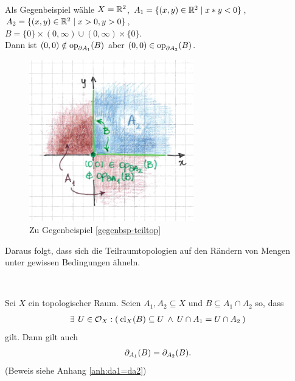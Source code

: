     \begin{gegenbsp}\label{gegenbsp-teiltop}\ \\
        Als Gegenbeispiel wähle $X = \mathbb{R}^2$, ${A_1 = \{(x,y) \in \mathbb{R}^2 \mid x*y < 0\}}$, ${A_2 = \{(x,y) \in \mathbb{R}^2 \mid x > 0, y > 0\}}$, \\
        ${B = \{0\} \times (0, \infty) \cup (0,\infty) \times \{0\}}$.\\
        Dann ist ${(0,0) \notin \text{op}_{\partial A_1}(B)}$ aber ${(0,0) \in \text{op}_{\partial A_2}(B)}$.
    \end{gegenbsp}
    \begin{figure}[ht]
        \centering
        \includegraphics[height=7cm]{abb/gegenbsp-teilraumtop.png}
        \caption{Zu Gegenbeispiel \ref{gegenbsp-teiltop}}
        \label{fig:gegenbsp-teilraumtop}
    \end{figure}

    Daraus folgt, dass sich die Teilraumtopologien auf den Rändern von Mengen unter gewissen Bedingungen ähneln.
    \begin{satz}\label{satz:da1=da2} \ \vspace{8pt}

        \noindent
        Sei $X$ ein topologischer Raum. Seien $A_1, A_2 \subseteq X$ und $B \subseteq A_1 \cap A_2$ so, dass
        \begin{align*}
            \exists\: \, U \in \mathcal{O}_X: (\: \text{cl}_X(B) \subseteq U \:\land\: U \cap A_1 = U \cap A_2 \:)
        \end{align*}
        gilt. Dann gilt auch  
        \begin{align*}
            \partial_{A_1}(B) = \partial_{A_2}(B).
        \end{align*}
        (Beweis siehe Anhang \ref{anh:da1=da2})
        
    \end{satz}

